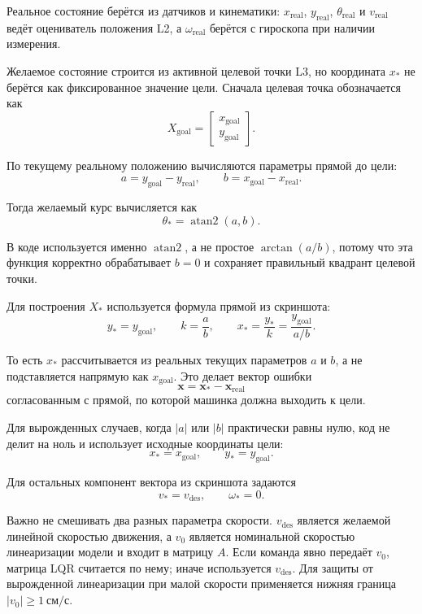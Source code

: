 \documentclass[12pt,a4paper]{article}
\newcommand{\vect}[1]{\mathbf{#1}}
\begin{document}
Реальное состояние берётся из датчиков и кинематики: \(x_{\mathrm{real}}\),
\(y_{\mathrm{real}}\), \(\theta_{\mathrm{real}}\) и \(v_{\mathrm{real}}\)
ведёт оцениватель положения L2, а \(\omega_{\mathrm{real}}\) берётся с
гироскопа при наличии измерения.

Желаемое состояние строится из активной целевой точки L3, но координата
\(x_{*}\) не берётся как фиксированное значение цели. Сначала целевая точка
обозначается как
\[
X_{\mathrm{goal}} =
\begin{bmatrix}
x_{\mathrm{goal}} \\
y_{\mathrm{goal}}
\end{bmatrix}.
\]

По текущему реальному положению вычисляются параметры прямой до цели:
\[
a = y_{\mathrm{goal}} - y_{\mathrm{real}},
\qquad
b = x_{\mathrm{goal}} - x_{\mathrm{real}}.
\]

Тогда желаемый курс вычисляется как
\[
\theta_{*} = \operatorname{atan2}(a, b).
\]

В коде используется именно \(\operatorname{atan2}\), а не простое
\(\arctan(a/b)\), потому что эта функция корректно обрабатывает \(b = 0\)
и сохраняет правильный квадрант целевой точки.

Для построения \(X_{*}\) используется формула прямой из скриншота:
\[
y_{*} = y_{\mathrm{goal}},
\qquad
k = \frac{a}{b},
\qquad
x_{*} = \frac{y_{*}}{k}
= \frac{y_{\mathrm{goal}}}{a/b}.
\]

То есть \(x_{*}\) рассчитывается из реальных текущих параметров \(a\) и
\(b\), а не подставляется напрямую как \(x_{\mathrm{goal}}\). Это делает
вектор ошибки
\[
\vect{x} = \vect{x}_{*} - \vect{x}_{\mathrm{real}}
\]
согласованным с прямой, по которой машинка должна выходить к цели.

Для вырожденных случаев, когда \(|a|\) или \(|b|\) практически равны нулю,
код не делит на ноль и использует исходные координаты цели:
\[
x_{*} = x_{\mathrm{goal}},
\qquad
y_{*} = y_{\mathrm{goal}}.
\]

Для остальных компонент вектора из скриншота задаются
\[
v_{*} = v_{\mathrm{des}},
\qquad
\omega_{*} = 0.
\]

Важно не смешивать два разных параметра скорости. \(v_{\mathrm{des}}\)
является желаемой линейной скоростью движения, а \(v_0\) является
номинальной скоростью линеаризации модели и входит в матрицу \(A\).
Если команда явно передаёт \(v_0\), матрица LQR считается по нему; иначе
используется \(v_{\mathrm{des}}\). Для защиты от вырожденной линеаризации
при малой скорости применяется нижняя граница \(|v_0| \ge 1\ \text{см/с}\).
\end{document}
